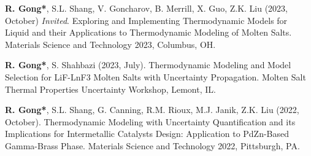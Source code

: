 
\begin{etaremune}

\item \textbf{R. Gong*}, S.L. Shang, V. Goncharov, B. Merrill, X. Guo, Z.K. Liu
(2023, October) \emph{Invited}.
Exploring and Implementing Thermodynamic Models for Liquid and their Applications to Thermodynamic Modeling of Molten Salts. 
Materials Science and Technology 2023,
Columbus, OH.
\item \textbf{R. Gong*}, S. Shahbazi
(2023, July).
Thermodynamic Modeling and Model Selection for LiF-LnF3 Molten Salts with Uncertainty Propagation.
Molten Salt Thermal Properties Uncertainty Workshop,
Lemont, IL.
\item \textbf{R. Gong*}, S.L. Shang, G. Canning, R.M. Rioux, M.J. Janik, Z.K. Liu
(2022, October).
Thermodynamic Modeling with Uncertainty Quantification and its Implications for Intermetallic Catalysts Design: Application to PdZn-Based Gamma-Brass Phase.
Materials Science and Technology 2022,
Pittsburgh, PA.

\end{etaremune}
\vspace{-0.6em}
\vspace{0.4em}